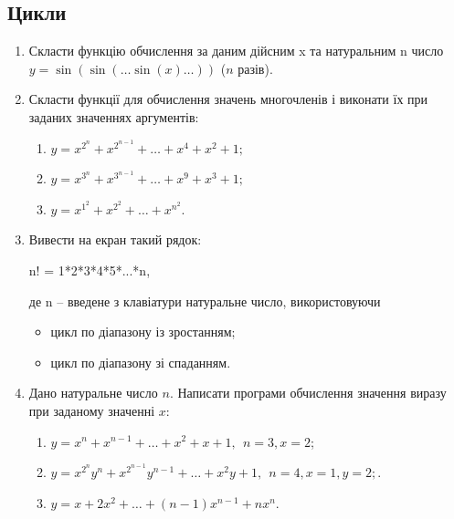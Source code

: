 \documentclass[]{article}
\makeatletter
\newcommand{\xslalph}[1]{\expandafter\@xslalph\csname c@#1\endcsname}
\newcommand{\@xslalph}[1]{%
    \ifcase#1\or а\or б\or в\or г\or д\or e\or є\or ж\or з\or i%
    \or й\or к\or л\or м\or н\or о\or п\or р\or с\or т%
    \or у\or ф\or х\or ц\or ч\or ш\or ю\or я\or аа\or бб\or вв %
    \else\@ctrerr\fi%
}
\makeatother
\begin{document}
\subsection {Цикли}
\begin{enumerate}
\def\labelenumi{\arabic{enumi})}
\item
  Скласти функцію обчислення за даним дійсним x та натуральним n число
  \(y = \sin(\sin(\ldots\sin(x)\ldots))\) ($n$ разів).


\item
  Скласти функції для обчислення значень многочленів і виконати їх при
  заданих значеннях аргументів:
\begin{enumerate}[label=\xslalph*)]
\item \(y = x^{2^{n}} + x^{2^{n - 1}} + \ldots + x^{4} + x^{2} + 1;\)

\item \(y = x^{3^{n}} + x^{3^{n - 1}} + \ldots + x^{9} + x^{3} + 1;\)

\item \(y = x^{1^{2}} + x^{2^{2}} + \ldots + x^{n^{2}}.\)

\end{enumerate}

\item
  Вивести на екран такий рядок:

n! = 1*2*3*4*5*...*n,

де n -- введене з клавіатури натуральне число, використовуючи
\begin{itemize}
\item цикл по діапазону із зростанням;
\item цикл по діапазону зі спаданням.
\end{itemize}

\item

  Дано натуральне число \(n\). Написати програми обчислення
  значення виразу при заданому значенні \(x\):


\begin{enumerate}[label=\xslalph*)]
\item
\(y = x^{n} + x^{n - 1} + \ldots + x^{2} + x + 1, \ \  n = 3,x = 2\);
\item
\(y = x^{2^{n}}y^{n} + x^{2^{n - 1}}y^{n - 1} + \ldots + x^{2}y + 1, \ \ n = 4,x = 1,y = 2;\).
\item
$ y = x + 2x^{2} + \ldots + (n - 1)x^{n - 1} + nx^{n}$.

\end{enumerate}



\end{enumerate}
\end{document}
